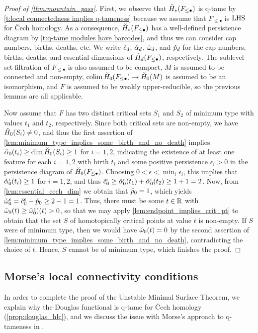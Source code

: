 \begin{proof}[Proof of \cref{thm:mountain_pass}]
    First, we observe that $\check{H}_*(F_{\leq \bullet})$ is q-tame by \cref{t:local connectedness implies q-tameness} because we assume that $F_{\leq \bullet}$ is $\mathrm{LHS}$ for \v{C}ech homology.
    As a consequence, $\check{H}_*(F_{\leq \bullet})$ has a well-defined persistence diagram by \cref{t:q-tame modules have barcodes}, and thus we can consider cap numbers, births, deaths, etc.
    We write $\check{c}_d$, $\check{\alpha}_d$, $\check{\omega}_d$, and $\check{p}_d$ for the cap numbers, births, deaths, and essential dimensions of $\check{H}_d(F_{\leq \bullet})$, respectively.
    The sublevel set filtration of $F_{\leq \bullet}$ is also assumed to be compact, $M$ is assumed to be connected and non-empty, $\operatorname*{colim} \check{H}_0(F_{\leq \bullet}) \to \check{H}_0(M)$ is assumed to be an isomorphism, and $F$ is assumed to be weakly upper-reducible, so the previous lemmas are all applicable.

	Now assume that $F$ has two distinct critical sets $S_{1}$ and $S_{2}$ of minimum type with values $t_{1}$ and $t_{2}$, respectively.
	Since both critical sets are non-empty, we have $\check{H}_{0}(S_{i}) \neq 0$, and thus the first assertion of \cref{lem:minimum_type_implies_some_birth_and_no_death} implies $\check{\alpha}_{0}(t_{i}) \geq \dim \check{H}_0(S_{i}) \geq 1$ for $i = 1,2$,
	indicating the existence of at least one feature for each $i = 1,2$ with birth $t_{i}$ and some positive persistence $\epsilon_i > 0$ in the persistence diagram of $\check{H}_0(F_{\leq \bullet})$.
	Choosing $0 < \epsilon < \min_i \epsilon_i$, this implies that
	$\check{\alpha}_{0}^{\epsilon}(t_{i}) \geq 1$ for $i = 1,2$,
	and thus
	$\check{c}_{0}^{\epsilon} \geq \check{\alpha}_{0}^{\epsilon}(t_{1}) + \check{\alpha}_{0}^{\epsilon}(t_{2}) \geq 1 + 1 = 2$.
	Now, from \cref{lem:essential_cech_dim} we obtain that $\check{p}_{0} = 1$, which yields $\check{\omega}_{0}^{\epsilon} = \check{c}_{0}^{\epsilon} - \check{p}_{0} \geq 2 - 1 = 1$.
	Thus, there must be some $t \in \mathbb{R}$ with $\check{\omega}_{0}(t) \geq \check{\omega}^{\epsilon}_{0})(t) > 0$, so that we may apply \cref{lem:endpoint_implies_crit_pt} to obtain that the set $S$ of homotopically critical points at value $t$ is non-empty.
	If $S$ were of minimum type, then we would have $\check{\omega}_{0}(t) = 0$ by the second assertion of \cref{lem:minimum_type_implies_some_birth_and_no_death}, contradicting the choice of $t$.
	Hence, $S$ cannot be of minimum type, which finishes the proof.
\end{proof}

\subsection{Morse's local connectivity conditions}\label{subsec:historic_hlc}
In order to complete the proof of the Unstable Minimal Surface Theorem, we explain why the Douglas functional is q-tame for \v{C}ech homology (\cref{prop:douglas_hlc}), and we discuss the issue with Morse's approach to q-tameness in \cite[Theorem 6.3]{Morse.1940}.

